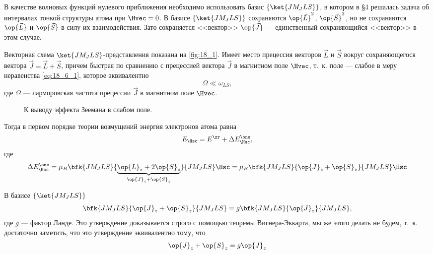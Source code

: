 В качестве волновых функций нулевого приближения необходимо использовать базис $\{ \ket{J M_J L S}\}$, в котором в \S 4 решалась задача об интервалах тонкой структуры атома при $\Hvec = 0$. В базисе $\{ \ket{J M_J L S}\}$ сохраняются $\op{\vec{L}}^2$, $\op{\vec{S}}^2$, но не сохраняются $\op{\vec{L}}$ и $\op{\vec{S}}$ в силу их взаимодействия. Зато сохраняется <<вектор>> $\op{\vec{J}}$ --- единственный сохраняющийся <<вектор>> в этом случае.

Векторная схема $\ket{J M_J L S}$-представления показана на \autoref{fig:18_1}. Имеет место прецессия векторов $\vec{L}$ и $\vec{S}$ вокруг сохраняющегося вектора $\vec{J} = \vec{L} + \vec{S}$, причем быстрая по сравнению с прецессией вектора $\vec{J}$ в магнитном поле $\Hvec$, т.~к. поле --- слабое в меру неравенства \eqref{eq:18_6_1}, которое эквивалентно
\begin{equation}
\label{eq:18_6_2}
\Omega \ll \omega_{LS},
\end{equation}
где $\Omega$ --- ларморовская частота прецессии $\vec{J}$ в магнитном поле $\Hvec$. %

\begin{figure}[h!]
\centering
{}
\caption{К выводу эффекта Зеемана в слабом поле.} \label{fig:18_1}
\end{figure}

Тогда в первом порядке теории возмущений энергия электронов атома равна 
$$
E_{\Hsc} = E^\zr + \Delta E_{\Hsc}^\one,
$$
где 
$$
\Delta E_{\Hsc}^\one = \mu_B \bfk{J M_J L S}{\underbrace{\op{L}_z + 2\op{S}_z}_{\op{J}_z + \op{S}_z}}{J M_J L S} \Hsc = \mu_B \bfk{J M_J L S}{\op{J}_z + \op{S}_z}{J M_J L S} \Hsc
$$

В базисе $\{ \ket{J M_J L S}\}$
$$
\bfk{J M_J L S}{\op{J}_z + \op{S}_z}{J M_J L S} = g\bfk{J M_J L S}{\op{J}_z}{J M_J L S},
$$
где $g$ --- фактор Ланде. Это утверждение доказывается строго с помощью теоремы Вигнера-Эккарта, мы же этого делать не будем, т.~к. достаточно заметить, что это утверждение эквивалентно тому, что
$$
\op{J}_z + \op{S}_z = g\op{J}_z
$$

